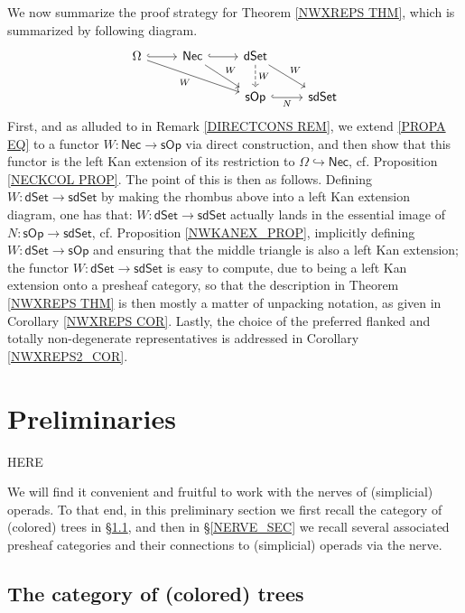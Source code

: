 \documentclass[a4paper,10pt
,draft
]{article}%
\numberwithin{equation}{section}
\numberwithin{figure}{section}
\theoremstyle{definition} %
\newcommand{\sOp}{\ensuremath{\mathsf{sOp}}}%
\newcommand{\1}{\ensuremath{\mathbbm 1}}%
\begin{document}
We now summarize the proof strategy
for Theorem \ref{NWXREPS THM},
which is summarized by following diagram.
\begin{equation}
\begin{tikzcd}
\Omega \ar[hookrightarrow]{r}
\ar{rrd}[swap]{W} 
&
\mathsf{Nec}
\ar[hookrightarrow]{r}
\ar{rd}{W}
&
\mathsf{dSet} \ar{rd}{W}
\ar[dashed]{d}{W}
\\
&&
\mathsf{sOp} \ar[hookrightarrow]{r}[swap]{N} &
\mathsf{sdSet}
\end{tikzcd}
\end{equation}
First, and as alluded to in Remark \ref{DIRECTCONS REM},
we extend \eqref{PROPA EQ}
to a functor
$W \colon \mathsf{Nec} \to \sOp$
via direct construction,
and then show that this functor is the left Kan extension of 
its restriction to 
$\Omega \hookrightarrow \mathsf{Nec}$,
cf. Proposition \ref{NECKCOL PROP}.
The point of this is then as follows.
Defining $W \colon \mathsf{dSet} \to \mathsf{sdSet}$
by making the rhombus above into a left Kan extension diagram,
one has that:
$W \colon \mathsf{dSet} \to \mathsf{sdSet}$
actually lands in the essential image
of $N \colon \sOp \to \mathsf{sdSet}$,
cf. Proposition \ref{NWKANEX_PROP},
implicitly defining 
$W \colon \mathsf{dSet} \to \sOp$
and ensuring that the middle triangle is also a left Kan extension;
the functor 
$W \colon \mathsf{dSet} \to \mathsf{sdSet}$
is easy to compute, due to being a left Kan extension onto a presheaf category,
so that the description in Theorem \ref{NWXREPS THM}
is then mostly a matter of unpacking notation,
as given in Corollary \ref{NWXREPS COR}.
Lastly, the choice of the preferred 
flanked and totally non-degenerate 
representatives is addressed in 
Corollary \ref{NWXREPS2_COR}.




\section{Preliminaries}

{\color{red} HERE}

We will find it convenient and fruitful to
work with the nerves of (simplicial) operads.
To that end, in this preliminary section
we first recall the category of (colored) trees in \S \ref{TREES_SEC},
and then in \S \ref{NERVE_SEC} we recall several associated presheaf categories and their connections to (simplicial) operads via the nerve.


\subsection{The category of (colored) trees}
\label{TREES_SEC}
\end{document}
